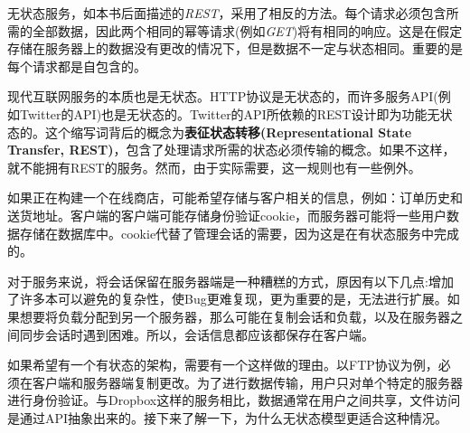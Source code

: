 无状态服务，如本书后面描述的\textit{REST}，采用了相反的方法。每个请求必须包含所需的全部数据，因此两个相同的幂等请求(例如\textit{GET})将有相同的响应。这是在假定存储在服务器上的数据没有更改的情况下，但是数据不一定与状态相同。重要的是每个请求都是自包含的。

现代互联网服务的本质也是无状态。HTTP协议是无状态的，而许多服务API(例如Twitter的API)也是无状态的。Twitter的API所依赖的REST设计即为功能无状态的。这个缩写词背后的概念为\textbf{表征状态转移(Representational State Transfer, REST)}，包含了处理请求所需的状态必须传输的概念。如果不这样，就不能拥有REST的服务。然而，由于实际需要，这一规则也有一些例外。

如果正在构建一个在线商店，可能希望存储与客户相关的信息，例如：订单历史和送货地址。客户端的客户端可能存储身份验证cookie，而服务器可能将一些用户数据存储在数据库中。cookie代替了管理会话的需要，因为这是在有状态服务中完成的。

对于服务来说，将会话保留在服务器端是一种糟糕的方式，原因有以下几点:增加了许多本可以避免的复杂性，使Bug更难复现，更为重要的是，无法进行扩展。如果想要将负载分配到另一个服务器，那么可能在复制会话和负载，以及在服务器之间同步会话时遇到困难。所以，会话信息都应该都保存在客户端。

如果希望有一个有状态的架构，需要有一个这样做的理由。以FTP协议为例，必须在客户端和服务器端复制更改。为了进行数据传输，用户只对单个特定的服务器进行身份验证。与Dropbox这样的服务相比，数据通常在用户之间共享，文件访问是通过API抽象出来的。接下来了解一下，为什么无状态模型更适合这种情况。













